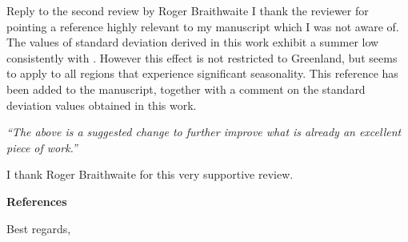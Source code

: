\documentclass{letter}
\newcommand{\rev}[0]{\color{blue!50!black}\it}
\newcommand{\textrev}[1]{{\rev``#1''}}
\begin{document}
\begin{letter}{Reply to the second review by Roger Braithwaite}
I thank the reviewer for pointing a reference highly relevant to my manuscript which I was not aware of. The values of standard deviation derived in this work exhibit a summer low consistently with \citet{fausto-etal-2011}. However this effect is not restricted to Greenland, but seems to apply to all regions that experience significant seasonality. This reference has been added to the manuscript, together with a comment on the standard deviation values obtained in this work.

\textrev{The above is a suggested change to further improve what is already an excellent piece of work.}

I thank Roger Braithwaite for this very supportive review.

\textbf{References}



\closing{Best regards,}

\end{letter}
\end{document}
